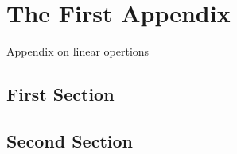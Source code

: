 \chapter{The First Appendix}
\label{sec:first-app}
Appendix on linear opertions
\section{First Section}
\kant[22]    %
\section{Second Section}
\kant[23-24] %